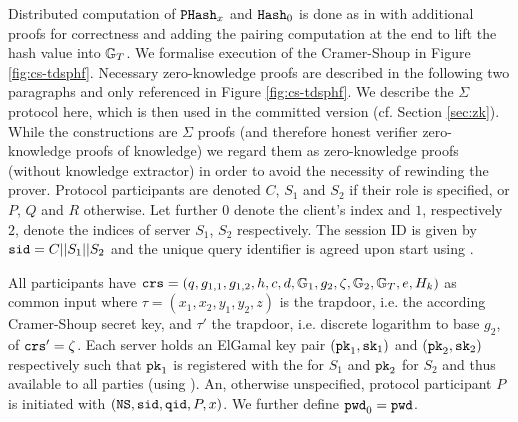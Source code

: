 \noindent
Distributed computation of $\mathtt{PHash}_x$ and $\mathtt{Hash}_0$ is done as in \DSPHF with additional proofs for correctness and adding the pairing computation at the end to lift the hash value into $\mathbb{G}_T$.
We formalise execution of the Cramer-Shoup \TDSPHF in Figure \ref{fig:cs-tdsphf}.
Necessary zero-knowledge proofs are described in the following two paragraphs and only referenced in Figure \ref{fig:cs-tdsphf}.
We describe the $\Sigma$ protocol here, which is then used in the committed version (cf. Section \ref{sec:zk}).
While the constructions are $\Sigma$ proofs (and therefore honest verifier zero-knowledge proofs of knowledge) we regard them as zero-knowledge proofs (without knowledge extractor) in order to avoid the necessity of rewinding the prover.
Protocol participants are denoted $C$, $S_1$ and $S_2$ if their role is specified, or $P$, $Q$ and $R$ otherwise.
Let further $0$ denote the client's index and $1$, respectively $2$, denote the indices of server $S_1$, $S_2$ respectively.
The session ID is given by $\mathtt{sid}=C||S_1||S_2$ and the unique query identifier \qid is agreed upon start using \Finit.

All \TDSPHF participants have $\mathtt{crs}=(q,g_{1,1},g_{1,2},h,c,d,\mathbb{G}_1,g_{2},\zeta,\mathbb{G}_2,\mathbb{G}_T,e,H_k)$ as common input where $\tau=(x_1,x_2,y_1,y_2,z)$ is the \crs trapdoor, i.e. the according Cramer-Shoup secret key, and $\tau'$ the trapdoor, i.e. discrete logarithm to base $g_2$, of $\mathtt{crs}'=\zeta$.
Each server holds an ElGamal key pair $(\mathtt{pk}_1, \mathtt{sk}_1)$ and $(\mathtt{pk}_2, \mathtt{sk}_2)$ respectively such that $\mathtt{pk}_1$ is registered with the \CA for $S_1$ and $\mathtt{pk}_2$ for $S_2$ and thus available to all parties (using \Fca).
An, otherwise unspecified, protocol participant $P$ is initiated with $(\mathtt{NS}, \mathtt{sid}, \mathtt{qid}, P, x)$.
We further define $\mathtt{pwd}_0=\mathtt{pwd}$.



